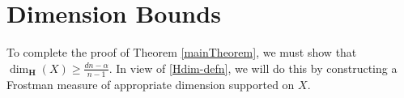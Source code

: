 \section{Dimension Bounds}\label{dimensionsection}
To complete the proof of Theorem \ref{mainTheorem}, we must show that $\dim_{\mathbf{H}}(X) \geq  \frac{dn - \alpha}{n - 1}$.  %
%
In view of \eqref{Hdim-defn}, we will do this by constructing a Frostman measure of appropriate dimension supported on $X$. 
%
%

